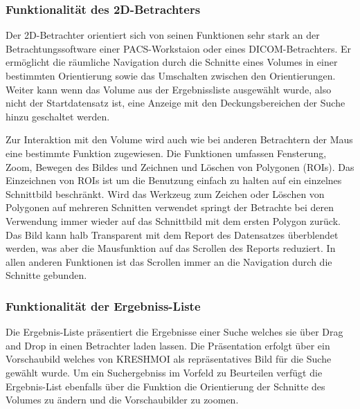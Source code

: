 \subsubsection{Funktionalität des 2D-Betrachters}
\label{sec:Funktionalität des 2D-Betrachters}
Der 2D-Betrachter orientiert sich von seinen Funktionen sehr stark an der Betrachtungssoftware einer PACS-Workstaion oder eines DICOM-Betrachters.
Er ermöglicht die räumliche Navigation durch die Schnitte eines Volumes in einer bestimmten Orientierung sowie das Umschalten zwischen den Orientierungen.
Weiter kann wenn das Volume aus der Ergebnissliste ausgewählt wurde, 
also nicht der Startdatensatz ist,
eine Anzeige mit den Deckungsbereichen der Suche hinzu geschaltet werden. 

Zur Interaktion mit den Volume wird auch wie bei anderen Betrachtern der Maus eine bestimmte Funktion zugewiesen.
Die Funktionen umfassen Fensterung, Zoom, Bewegen des Bildes und Zeichnen und Löschen von Polygonen (ROIs).
Das Einzeichnen von ROIs ist um die Benutzung einfach zu halten auf ein einzelnes Schnittbild beschränkt.
Wird das Werkzeug zum Zeichen oder Löschen von Polygonen auf mehreren Schnitten verwendet springt der Betrachte bei deren Verwendung immer wieder auf das Schnittbild mit dem ersten Polygon zurück.
Das Bild kann halb Transparent mit dem Report des Datensatzes überblendet werden, was aber die Mausfunktion auf das Scrollen des Reports reduziert.
In allen anderen Funktionen ist das Scrollen immer an die Navigation durch die Schnitte gebunden.

\subsubsection{Funktionalität der Ergebniss-Liste}
\label{sec:Funktionalität der Ergebniss-Liste}
Die Ergebnis-Liste präsentiert die Ergebnisse einer Suche welches sie über Drag and Drop in einen Betrachter laden lassen.
Die Präsentation erfolgt über ein Vorschaubild welches von KRESHMOI als repräsentatives Bild für die Suche gewählt wurde.
Um ein Suchergebniss im Vorfeld zu Beurteilen verfügt die Ergebnis-List ebenfalls über die Funktion die Orientierung der Schnitte des Volumes zu ändern und die Vorschaubilder zu zoomen.

